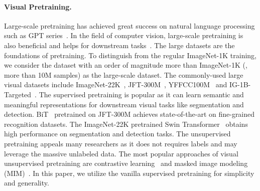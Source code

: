 \documentclass[10pt,twocolumn,letterpaper]{article}
\begin{document}
\paragraph{Visual Pretraining.}
Large-scale pretraining has achieved great success on natural language processing such as GPT series~\cite{gpt3,gpt4}. In the field of computer vision, large-scale pretraining is also beneficial and helps for downstream tasks~\cite{bit,swin,sam}.
The large datasets are the foundations of pretraining. To distinguish from the regular ImageNet-1K training, we consider the dataset with an order of magnitude more than ImageNet-1K (\ie, more than 10M samples) as the large-scale dataset. The commonly-used large visual datasets include ImageNet-22K~\cite{imagenet}, JFT-300M~\cite{sun2017revisiting}, YFFCC100M~\cite{yfcc100m} and IG-1B-Targeted~\cite{yalniz2019billion}.
The supervised pretraining is popular as it can learn semantic and meaningful representations for downstream visual tasks like segmentation and detection. BiT~\cite{bit} pretrained on JFT-300M achieves state-of-the-art on fine-grained recognition datasets. The ImageNet-22K pretrained Swin Transformer~\cite{swin} obtains high performance on segmentation and detection tasks.
The unsupervised pretraining appeals many researchers as it does not requires labels and may leverage the massive unlabeled data. The most popular approaches of visual unsupervised pretraining are contrastive learning~\cite{he2020momentum,simclr} and masked image modeling (MIM)~\cite{bao2021beit,he2022masked,xie2022simmim}.
In this paper, we utilize the vanilla supervised pretraining for simplicity and generality.
\end{document}
